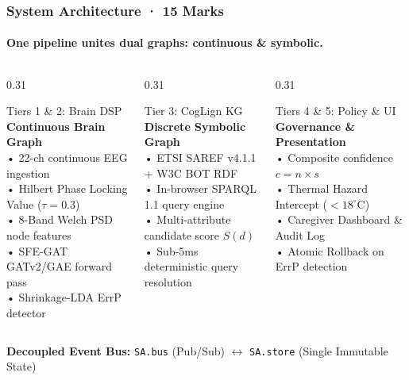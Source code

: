 \documentclass[aspectratio=169,10pt]{beamer}
\begin{document}
\begin{frame}
    \frametitle{System Architecture · 15 Marks}
    \framesubtitle{One pipeline unites dual graphs: continuous \& symbolic.}
    \begin{columns}[T]
        \begin{column}{0.31\textwidth}
            \begin{block}{\small Tiers 1 \& 2: Brain DSP}
                \scriptsize
                \textbf{Continuous Brain Graph}\\
                • 22-ch continuous EEG ingestion\\
                • Hilbert Phase Locking Value ($\tau = 0.3$)\\
                • 8-Band Welch PSD node features\\
                • SFE-GAT GATv2/GAE forward pass\\
                • Shrinkage-LDA ErrP detector
            \end{block}
        \end{column}
        \begin{column}{0.31\textwidth}
            \begin{block}{\small Tier 3: CogLign KG}
                \scriptsize
                \textbf{Discrete Symbolic Graph}\\
                • ETSI SAREF v4.1.1 + W3C BOT RDF\\
                • In-browser SPARQL 1.1 query engine\\
                • Multi-attribute candidate score $S(d)$\\
                • Sub-5ms deterministic query resolution
            \end{block}
        \end{column}
        \begin{column}{0.31\textwidth}
            \begin{block}{\small Tiers 4 \& 5: Policy \& UI}
                \scriptsize
                \textbf{Governance \& Presentation}\\
                • Composite confidence $c = n \times s$\\
                • Thermal Hazard Intercept ($< 18^\circ$C)\\
                • Caregiver Dashboard \& Audit Log\\
                • Atomic Rollback on ErrP detection
            \end{block}
        \end{column}
    \end{columns}
    \vspace{0.2cm}
    {\scriptsize \textbf{Decoupled Event Bus:} \texttt{SA.bus} (Pub/Sub) $\longleftrightarrow$ \texttt{SA.store} (Single Immutable State)}
\end{frame}
\end{document}
